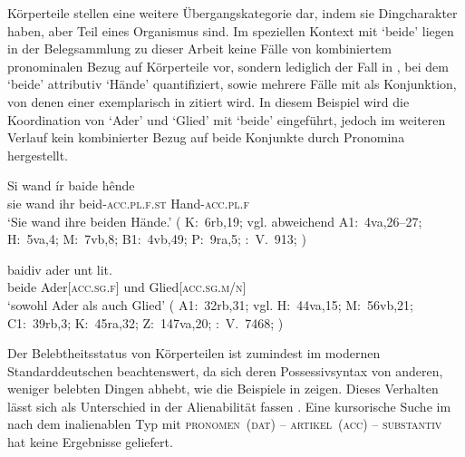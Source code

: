 Körperteile stellen eine weitere Übergangskategorie dar, indem sie
Dingcharakter haben, aber Teil eines Organismus sind. Im speziellen Kontext mit
 `beide' liegen in der Belegsammlung zu dieser Arbeit keine
Fälle von kombiniertem pronominalen Bezug auf Körperteile vor, sondern
lediglich der Fall in , bei dem 
`beide' attributiv  `Hände' quantifiziert, sowie mehrere
Fälle mit  als Konjunktion, von denen einer exemplarisch in
 zitiert wird. In diesem Beispiel wird die Koordination
von  `Ader' und  `Glied' mit 
`beide' eingeführt, jedoch im weiteren Verlauf kein kombinierter Bezug auf
beide Konjunkte durch Pronomina hergestellt.

\begin{exe}
\ex \begin{xlist}
	\ex \label{ex:bodyparts_attr}
		\gll Si wand ír baide hênde \\
			sie wand ihr beid-\textsc{acc.pl.f.st} Hand-\textsc{acc.pl.f} \\
		\trans `Sie wand ihre beiden Hände.'
			(%
				K:~6rb,19; vgl. abweichend
				A1:~4va,26--27;
				H:~5va,4;
				M:~7vb,8;
				B1:~4vb,49;
				P:~9ra,5;
				\KC:~V.~913; \cite[98]{schroeder1895}%
			)

	\ex \label{ex:bodyparts_conj}
		\gll baidiv ader unt lit. \\
			beide Ader[\textsc{acc.sg.f}] und Glied[\textsc{acc.sg.m/n}] \\
		\trans `sowohl Ader als auch Glied'
			(%
				A1:~32rb,31; vgl.
				H:~44va,15;
				M:~56vb,21;
				C1:~39rb,3;
				K:~45ra,32;
				Z:~147va,20;
				\KC:~V.~7468; \cite[218]{schroeder1895}%
			)
\end{xlist}
\end{exe}

Der Belebtheitsstatus von Körperteilen ist zumindest im modernen
Standarddeutschen beachtenswert, da sich deren Possessivsyntax von anderen,
weniger belebten Dingen abhebt, wie die Beispiele in 
zeigen. Dieses Verhalten lässt sich als Unterschied in der Alienabilität fassen
\autocites{nichols1988}[17--18]{heine1997}. Eine kursorische Suche im \REM{}
nach dem inalienablen Typ mit \textsc{pronomen}~(\textsc{dat}) --
\textsc{artikel}~(\textsc{acc}) -- \textsc{substantiv} hat keine Ergebnisse
geliefert.

	\begin{exe}
	\end{exe}

